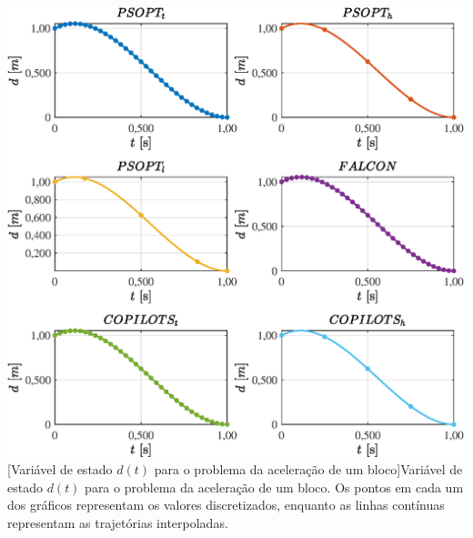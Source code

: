 \noindent
\begin{minipage}{\textwidth}
	\vspace{\onelineskip}
	\centering
	\includegraphics[scale=0.7]{fig/resultados/integrador/traj/x/d}
	[Variável de estado $d(t)$ para o problema da aceleração de um bloco]{Variável de estado $d(t)$ para o problema da aceleração de um bloco. Os pontos em cada um dos gráficos representam os valores discretizados, enquanto as linhas contínuas representam as trajetórias interpoladas.}
	\label{fig:integrador:x:d}
	\vspace{\onelineskip}
\end{minipage}

